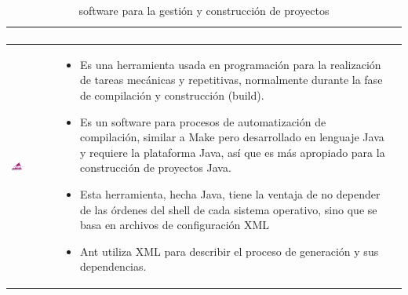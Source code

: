 \begin{table}[b!]
\begin{tabular}{|p{2cm}|ll}
{\begin{itemize}
       \cite{36}
      \end{itemize}} \\
        \hline
          \multicolumn{1}{|p{5cm}|}{\includegraphics[width=0.3\textwidth]{images/ant}} & 
          \multicolumn{1}{p{10cm}|}{
          \begin{itemize}
          \vspace{-27mm}
          \item Es una herramienta usada en programación para la realización de tareas mecánicas y repetitivas, normalmente durante la fase de compilación y construcción (build). 
        \item Es un software para procesos de automatización de compilación, similar a Make pero desarrollado en lenguaje Java y requiere la plataforma Java, así que es más apropiado para la construcción de proyectos Java.
        \item Esta herramienta, hecha Java, tiene la ventaja de no depender de las órdenes del shell de cada sistema operativo, sino que se basa en archivos de configuración XML 
        \item  Ant utiliza XML para describir el proceso de generación y sus dependencias. \cite{37}
      \end{itemize}} \\ 
       \hline
      \end{tabular}
       \caption{ software para la gestión y construcción de proyectos}
      \label{table:Cuadro Comparativo de software para la gestión y construcción de proyectos}
    \end{table}

